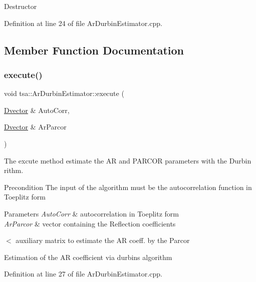 Destructor 

Definition at line 24 of file Ar\+Durbin\+Estimator.\+cpp.



\subsection{Member Function Documentation}
\mbox{\label{classtsa_1_1_ar_durbin_estimator_acefc1efc5c95e7b7b2703eab6aa0bcd6}} 
\subsubsection{\texorpdfstring{execute()}{execute()}}
{\footnotesize\ttfamily void tsa\+::\+Ar\+Durbin\+Estimator\+::execute (\begin{DoxyParamCaption}\item[{\hyperlink{namespacetsa_a8900fb03d849baf447a1a0efe2561fb2}{Dvector} \&}]{Auto\+Corr,  }\item[{\hyperlink{namespacetsa_a8900fb03d849baf447a1a0efe2561fb2}{Dvector} \&}]{Ar\+Parcor }\end{DoxyParamCaption})}

The excute method estimate the AR and P\+A\+R\+C\+OR parameters with the Durbin rithm. \begin{DoxyPrecond}{Precondition}
The input of the algorithm must be the autocorrelation function in Toeplitz form
\end{DoxyPrecond}

\begin{DoxyParams}{Parameters}
{\em Auto\+Corr} & autocorrelation in Toeplitz form \\
\hline
{\em Ar\+Parcor} & vector containing the Reflection coefficients \\
\hline
\end{DoxyParams}
$<$ auxiliary matrix to estimate the AR coeff. by the Parcor

Estimation of the AR coefficient via durbin\textquotesingle{}s algorithm 

Definition at line 27 of file Ar\+Durbin\+Estimator.\+cpp.

\mbox{\label{classtsa_1_1_ar_durbin_estimator_adce1261baa333e3a2c0c2c502544d135}} 

